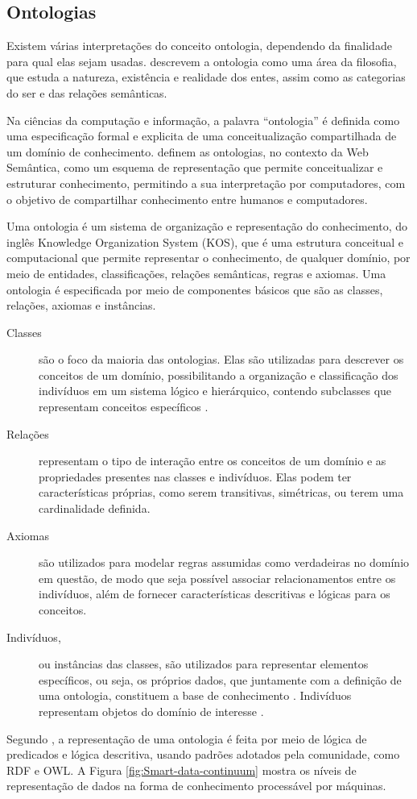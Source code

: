 \subsection*{Ontologias}

Existem várias interpretações do conceito ontologia, dependendo da
finalidade para qual elas sejam usadas. \citet{Smith2007} descrevem
a ontologia como uma área da filosofia, que estuda a natureza, existência
e realidade dos entes, assim como as categorias do ser e das relações
semânticas.

Na ciências da computação e informação, a palavra ``ontologia''
é definida como uma especificação formal e explicita de uma conceitualização
compartilhada de um domínio de conhecimento. \citet{allemang2011semantic}
definem as ontologias, no contexto da Web Semântica, como um esquema
de representação que permite conceitualizar e estruturar conhecimento,
permitindo a sua interpretação por computadores, com o objetivo de
compartilhar conhecimento entre humanos e computadores.

Uma ontologia é um sistema de organização e representação do conhecimento,
do inglês \foreignlanguage{english}{Knowledge Organization System
(KOS)}, que é uma estrutura conceitual e computacional que permite
representar o conhecimento, de qualquer domínio, por meio de entidades,
classificações, relações semânticas, regras e axiomas. Uma ontologia
é especificada por meio de componentes básicos que são as classes,
relações, axiomas e instâncias. 
\begin{description}
\item [{Classes}] são o foco da maioria das ontologias. Elas são utilizadas
para descrever os conceitos de um domínio, possibilitando a organização
e classificação dos indivíduos em um sistema lógico e hierárquico,
contendo subclasses que representam conceitos específicos \citep{noy2001ontology}. 
\item [{Relações}] representam o tipo de interação entre os conceitos de
um domínio e as propriedades presentes nas classes e indivíduos. Elas
podem ter características próprias, como serem transitivas, simétricas,
ou terem uma cardinalidade definida. 
\item [{Axiomas}] são utilizados para modelar regras assumidas como verdadeiras
no domínio em questão, de modo que seja possível associar relacionamentos
entre os indivíduos, além de fornecer características descritivas
e lógicas para os conceitos. 
\item [{Indivíduos,}] ou instâncias das classes, são utilizados para representar
elementos específicos, ou seja, os próprios dados, que juntamente
com a definição de uma ontologia, constituem a base de conhecimento
\citep{noy2001ontology}. Indivíduos representam objetos do domínio
de interesse \citep{horridge2011owl}.
\end{description}
Segundo \citet{Patel-schneider05buildingthe}, a representação de
uma ontologia é feita por meio de lógica de predicados e lógica descritiva,
usando padrões adotados pela comunidade, como \foreignlanguage{english}{RDF}
e \foreignlanguage{english}{OWL}. A Figura \ref{fig:Smart-data-continuum}
mostra os níveis de representação de dados na forma de conhecimento
processável por máquinas.

